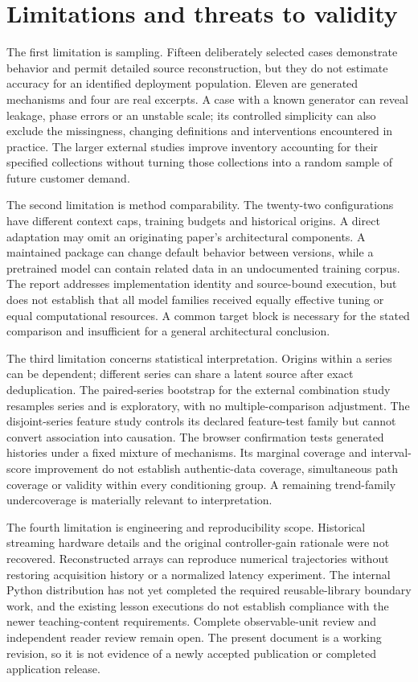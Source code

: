 \section{Limitations and threats to validity}
The first limitation is sampling. Fifteen deliberately selected cases demonstrate behavior and permit detailed source reconstruction, but they do not estimate accuracy for an identified deployment population. Eleven are generated mechanisms and four are real excerpts. A case with a known generator can reveal leakage, phase errors or an unstable scale; its controlled simplicity can also exclude the missingness, changing definitions and interventions encountered in practice. The larger external studies improve inventory accounting for their specified collections without turning those collections into a random sample of future customer demand.

The second limitation is method comparability. The twenty-two configurations have different context caps, training budgets and historical origins. A direct adaptation may omit an originating paper's architectural components. A maintained package can change default behavior between versions, while a pretrained model can contain related data in an undocumented training corpus. The report addresses implementation identity and source-bound execution, but does not establish that all model families received equally effective tuning or equal computational resources. A common target block is necessary for the stated comparison and insufficient for a general architectural conclusion.

The third limitation concerns statistical interpretation. Origins within a series can be dependent; different series can share a latent source after exact deduplication. The paired-series bootstrap for the external combination study resamples series and is exploratory, with no multiple-comparison adjustment. The disjoint-series feature study controls its declared feature-test family but cannot convert association into causation. The browser confirmation tests generated histories under a fixed mixture of mechanisms. Its marginal coverage and interval-score improvement do not establish authentic-data coverage, simultaneous path coverage or validity within every conditioning group. A remaining trend-family undercoverage is materially relevant to interpretation.

The fourth limitation is engineering and reproducibility scope. Historical streaming hardware details and the original controller-gain rationale were not recovered. Reconstructed arrays can reproduce numerical trajectories without restoring acquisition history or a normalized latency experiment. The internal Python distribution has not yet completed the required reusable-library boundary work, and the existing lesson executions do not establish compliance with the newer teaching-content requirements. Complete observable-unit review and independent reader review remain open. The present document is a working revision, so it is not evidence of a newly accepted publication or completed application release.

